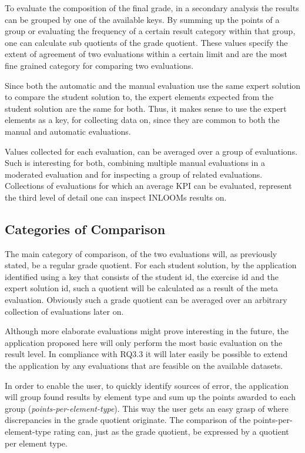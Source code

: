 To evaluate the composition of the final grade, in a secondary analysis the results can be 
grouped by one of the available keys. By summing up the points of a group or evaluating the 
frequency of a certain result category within that group, one can calculate sub quotients of 
the grade quotient. These values specify the extent of agreement of two evaluations within a 
certain limit and are the most fine grained category for comparing two evaluations. 

Since both the automatic and the manual evaluation use the same expert solution to compare
the student solution to, the expert elements expected from the student solution are the 
same for both. Thus, it makes sense to use the expert elements as a key, for collecting data
on, since they are common to both the manual and automatic evaluations. 

Values collected for each evaluation, can be averaged over a group of evaluations. 
Such is interesting for both, combining multiple manual evaluations in a moderated evaluation
and for inspecting a group of related evaluations. Collections of evaluations for which an
average KPI can be evaluated, represent the third level of detail one can inspect INLOOMs 
results on.



\subsection{Categories of Comparison}

The main category of comparison, of the two evaluations will, as previously stated, be a regular
grade quotient. For each student solution, by the application identified using a key that 
consists of the student id, the exercise id and the expert solution id, such a quotient 
will be calculated as a result of the meta evaluation. Obviously such a grade quotient can 
be averaged over an arbitrary collection of evaluations later on.

Although more elaborate evaluations might prove interesting in the future, the application 
proposed here will only perform the most basic evaluation on the result level. In compliance
with RQ3.3 it will later easily be possible to extend the application by any evaluations 
that are feasible on the available datasets. 

In order to enable the user, to quickly identify sources of error, the application will group
found results by element type and sum up the points awarded to each group 
(\textit{points-per-element-type}). This way the user gets an easy grasp of where discrepancies
in the grade quotient originate. The comparison of the points-per-element-type rating can, just 
as the grade quotient, be expressed by a quotient per element type.

